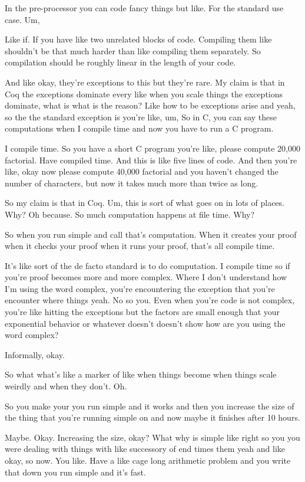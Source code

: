\begin{subappendices}
    In the pre-processor you can code fancy things but like. For the standard use case. Um, 
    
    Like if. If you have like two unrelated blocks of code. Compiling them like shouldn't be that much harder than like compiling them separately. So compilation should be roughly linear in the length of your code. 
    
    And like okay, they're exceptions to this but they're rare. My claim is that in Coq the exceptions dominate every like when you scale things the exceptions dominate, what is what is the reason? Like how to be exceptions arise and yeah, so the the standard exception is you're like, um, So in C, you can say these computations when I compile time and now you have to run a C program. 
    
    I compile time. So you have a short C program you're like, please compute 20,000 factorial. Have compiled time. And this is like five lines of code. And then you're like, okay now please compute 40,000 factorial and you haven't changed the number of characters, but now it takes much more than twice as long. 
    
    So my claim is that in Coq. Um, this is sort of what goes on in lots of places. Why? Oh because. So much computation happens at file time. Why? 
    
    So when you run simple and call that's computation. When it creates your proof when it checks your proof when it runs your proof, that's all compile time. 
    
    It's like sort of the de facto standard is to do computation. I compile time so if you're proof becomes more and more complex. Where I don't understand how I'm using the word complex, you're encountering the exception that you're encounter where things yeah. No so you. Even when you're code is not complex, you're like hitting the exceptions but the factors are small enough that your exponential behavior or whatever doesn't doesn't show how are you using the word complex? 
    
    Informally, okay. 
    
    So what what's like a marker of like when things become when things scale weirdly and when they don't. Oh. 
    
    So you make your you run simple and it works and then you increase the size of the thing that you're running simple on and now maybe it finishes after 10 hours. 
    
    Maybe. Okay. Increasing the size, okay? What why is simple like right so you you were dealing with things with like successory of end times them yeah and like okay, so now. You like. Have a like cage long arithmetic problem and you write that down you run simple and it's fast. 
    

\end{subappendices}
